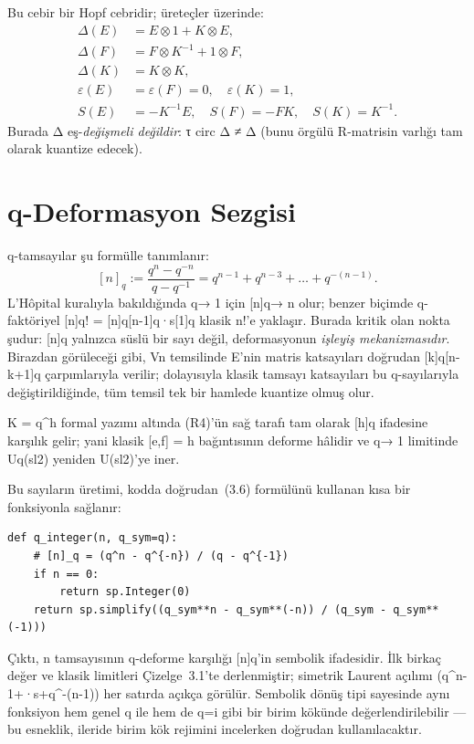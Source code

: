 \documentclass[12pt,a4paper]{report}
\numberwithin{equation}{chapter}
\theoremstyle{plain}
\theoremstyle{definition}
\begin{document}
Bu cebir bir Hopf cebridir; üreteçler üzerinde:
\begin{align}
  \Delta(E) &= E \otimes 1 + K \otimes E, \\
  \Delta(F) &= F \otimes K^{-1} + 1 \otimes F, \\
  \Delta(K) &= K \otimes K, \\
  \varepsilon(E) &= \varepsilon(F) = 0, \quad \varepsilon(K) = 1, \\
  S(E) &= -K^{-1} E, \quad S(F) = -F K, \quad S(K) = K^{-1}.
\end{align}
Burada Δ eş-\emph{değişmeli değildir}: τ circ Δ ≠ Δ (bunu
örgülü R-matrisin varlığı tam olarak kuantize edecek).

\section{q-Deformasyon Sezgisi}

q-tamsayılar şu formülle tanımlanır:
\begin{equation}\label{eq:qint}
  [n]_q := \frac{q^n - q^{-n}}{q - q^{-1}} = q^{n-1} + q^{n-3} + \dots + q^{-(n-1)}.
\end{equation}
L'H{\^o}pital kuralıyla bakıldığında q→ 1 için [n]q→ n olur; benzer
biçimde q-faktöriyel [n]q! = [n]q[n-1]q·s[1]q klasik
n!'e yaklaşır. Burada kritik olan nokta şudur: [n]q yalnızca süslü bir
sayı değil, deformasyonun \emph{işleyiş mekanizmasıdır}. Birazdan görüleceği
gibi, Vn temsilinde E'nin matris katsayıları doğrudan
[k]q[n-k+1]q çarpımlarıyla verilir; dolayısıyla klasik tamsayı
katsayıları bu q-sayılarıyla değiştirildiğinde, tüm temsil tek bir hamlede
kuantize olmuş olur.

K = q^h formal yazımı altında (R4)'ün sağ tarafı tam olarak [h]q
ifadesine karşılık gelir; yani klasik [e,f] = h bağıntısının deforme hâlidir
ve q→ 1 limitinde Uq(sl2) yeniden U(sl2)'ye iner.

Bu sayıların üretimi, kodda doğrudan~(3.6) formülünü kullanan kısa bir
fonksiyonla sağlanır:

\begin{lstlisting}[style=pyblock,caption={q-tamsayinin SymPy ile modellenmesi}]
def q_integer(n, q_sym=q):
    # [n]_q = (q^n - q^{-n}) / (q - q^{-1})
    if n == 0:
        return sp.Integer(0)
    return sp.simplify((q_sym**n - q_sym**(-n)) / (q_sym - q_sym**(-1)))
\end{lstlisting}

Çıktı, n tamsayısının q-deforme karşılığı [n]q'in sembolik ifadesidir.
İlk birkaç değer ve klasik limitleri Çizelge~3.1'te derlenmiştir;
simetrik Laurent açılımı (q^n-1+·s+q^-(n-1)) her satırda açıkça
görülür. Sembolik dönüş tipi sayesinde aynı fonksiyon hem genel q ile hem de
q=i gibi bir birim kökünde değerlendirilebilir --- bu esneklik, ileride birim
kök rejimini incelerken doğrudan kullanılacaktır.
\end{document}

